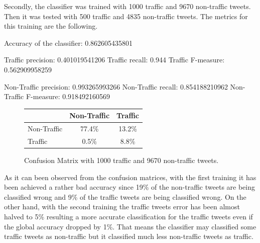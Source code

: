 Secondly, the classifier was trained with 1000 traffic and 9670 non-traffic tweets. Then it was tested with 500 traffic and 4835 non-traffic tweets. The metrics for this training are the following. 

Accuracy of the classifier:   0.862605435801

Traffic precision:            0.401019541206
Traffic recall:               0.944
Traffic F-measure:            0.562909958259

Non-Traffic precision:        0.993265993266
Non-Traffic recall:           0.854188210962
Non-Traffic F-measure:        0.918492160569

\begin{figure}[h]
\begin{center}
    \begin{tabular}{| l || c | c | }
    \hline
          & Non-Traffic & Traffic \\ \hline \hline
        Non-Traffic & 77.4\% & 13.2\% \\ \hline
        Traffic & 0.5\% & 8.8\% \\ \hline
    \end{tabular}
    \caption{Confusion Matrix with 1000 traffic and 9670 non-traffic tweets.}
    \label{fig:confusionMatrix1}
\end{center}
\end{figure}
	
As it can been observed from the confusion matrices, with the first training it has been achieved a rather bad accuracy since 19\% of the non-traffic tweets are being classified wrong and 9\% of the traffic tweets are being classified wrong. On the other hand, with the second training the traffic tweets error has been almost halved to 5\% resulting a more accurate classification for the traffic tweets even if the global accuracy dropped by 1\%. That means the classifier may classified some traffic tweets as non-traffic but it classified much less non-traffic tweets as traffic.

